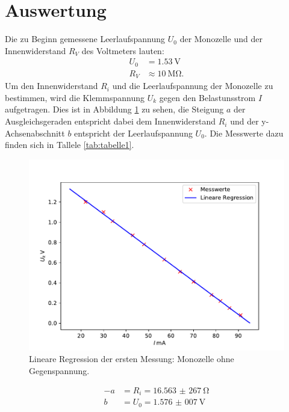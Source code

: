 \section{Auswertung}
Die zu Beginn gemessene Leerlaufspannung $U_{0}$ der Monozelle und der
Innenwiderstand $R_{V}$ des Voltmeters lauten:
\begin{align*}
  U_{0} &= \SI{1,53}{\volt} \\
  R_{V} &\approx \SI{10}{\Mohm}.
\end{align*}
\noindent Um den Innenwiderstand $R_{i}$ und die Leerlaufspannung der Monozelle zu
bestimmen, wird die Klemmspannung $U_{k}$ gegen den Belastunsstrom $I$ aufgetragen.
Dies ist in Abbildung \ref{fig:plot1} zu sehen, die Steigung $a$ der Ausgleichsgeraden
entspricht dabei dem Innenwiderstand $R_{i}$ und der y-Achsenabschnitt $b$ entspricht
der Leerlaufspannung $U_{0}$.
Die Messwerte dazu finden sich in Tallele \ref{tab:tabelle1}.

\begin{figure}[H]
  \centering
  \includegraphics{plot1.pdf}
  \caption{Lineare Regression der ersten Messung: Monozelle ohne Gegenspannung.}
  \label{fig:plot1}
\end{figure}

\begin{align*}
  -a &= R_{i} = \SI{16,563(267)}{\ohm} \\
  b &= U_{0} = \SI{1,576(007)}{\volt}
\end{align*}

